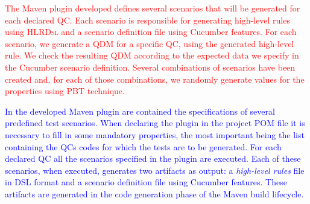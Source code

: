 \documentclass[AMA,STIX1COL,hidelinks]{WileyNJD-v2}
\newcommand{\callers}{\emph{high-level rules}\xspace}
\newcommand{\hlrdsl}{\textsc{HLRDsl}\xspace}
\begin{document}

\textcolor{red}{
The Maven plugin developed defines several scenarios that will be generated for each declared QC. Each scenario is responsible for generating high-level rules using \hlrdsl and a scenario definition file using Cucumber features. For each scenario, we generate a QDM for a specific QC, using the generated high-level rule.
We check the resulting QDM according to the expected data we specify in the Cucumber scenario definition. Several combinations of scenarios have been created and, for each of those combinations, we randomly generate values for the properties using PBT technique. }

\textcolor{blue}{
In the developed Maven plugin are contained the specifications of several predefined test scenarios. When declaring the plugin in the project POM file it is necessary to fill in some mandatory properties, the most important being the list containing the QCs codes for which the tests are to be generated. For each declared QC all the scenarios specified in the plugin are executed. Each of these scenarios, when executed, generates two artifacts as output: a \callers file in DSL format and a scenario definition file using Cucumber features. These artifacts are generated in the code generation phase of the Maven build lifecycle.}
\end{document}
